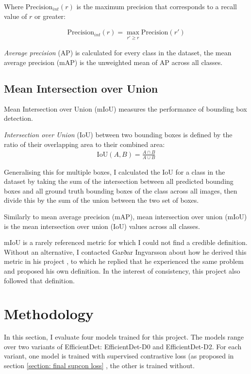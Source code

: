 \documentclass[12pt,a4paper,twoside,openany]{report}
\begin{document}
Where $\text{Precision}_{int}(r)$ is the maximum precision that corresponds to a recall value of $r$ or greater:

\begin{align}
    \text{Precision}_{int}(r) = \max\limits_{r' \geq r} \text{Precision}(r')
\end{align}

\textit{Average precision} (AP) is calculated for every class in the dataset, the mean average precision (mAP) is the unweighted mean of AP across all classes. 

\subsection{Mean Intersection over Union} \label{section:explain_miou}
Mean Intersection over Union (mIoU) measures the performance of bounding box detection. 

\textit{Intersection over Union} (IoU) between two bounding boxes is defined by the ratio of their overlapping area to their combined area:
\begin{align}
    \text{IoU}(A, B) = \frac{A \cap B}{A \cup B}
\end{align}

Generalising this for multiple boxes, I calculated the IoU for a class in the dataset by taking the sum of the intersection between all predicted bounding boxes and all ground truth bounding boxes of the class across all images, then divide this by the sum of the union between the two set of boxes. 

Similarly to mean average precision (mAP), mean intersection over union (mIoU) is the mean intersection over union (IoU) values across all classes.

mIoU  is a rarely referenced metric for which I could not find a credible definition. Without an alternative, I contacted Garðar Ingvarsson about how he derived this metric in his project \cite{ingvarsson_deep-sea_2022}, to which he replied that he experienced the same problem and proposed his own definition. In the interest of consistency, this project also followed that definition.

\section{Methodology}
In this section, I evaluate four models trained for this project. The models range over two variants of EfficientDet\cite{tan_efficientdet_2020}: EfficientDet-D0 and EfficientDet-D2. For each variant, one model is trained with supervised contrastive loss (as proposed in section \ref{section: final supcon loss} , the other is trained without. 
\end{document}

